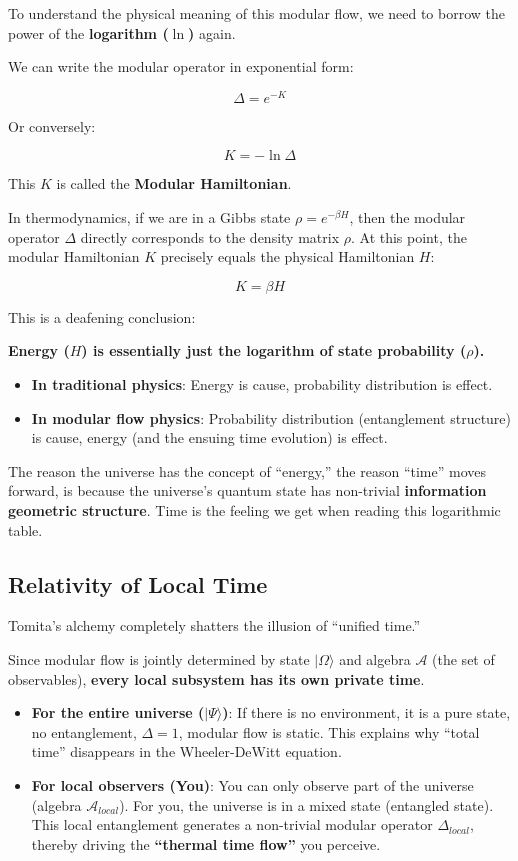 \documentclass[11pt,a4paper,twoside]{book}
\begin{document}
To understand the physical meaning of this modular flow, we need to borrow the power of the \textbf{logarithm ($\ln$)} again.

We can write the modular operator in exponential form:

$$\Delta = e^{-K}$$

Or conversely:

$$K = -\ln \Delta$$

This $K$ is called the \textbf{Modular Hamiltonian}.

In thermodynamics, if we are in a Gibbs state $\rho = e^{-\beta H}$, then the modular operator $\Delta$ directly corresponds to the density matrix $\rho$. At this point, the modular Hamiltonian $K$ precisely equals the physical Hamiltonian $H$:

$$K = \beta H$$

This is a deafening conclusion:

\textbf{Energy ($H$) is essentially just the logarithm of state probability ($\rho$).}

\begin{itemize}
\item \textbf{In traditional physics}: Energy is cause, probability distribution is effect.

\item \textbf{In modular flow physics}: Probability distribution (entanglement structure) is cause, energy (and the ensuing time evolution) is effect.
\end{itemize}

The reason the universe has the concept of ``energy,'' the reason ``time'' moves forward, is because the universe's quantum state has non-trivial \textbf{information geometric structure}. Time is the feeling we get when reading this logarithmic table.

\subsection{Relativity of Local Time}

Tomita's alchemy completely shatters the illusion of ``unified time.''

Since modular flow is jointly determined by state $|\Omega\rangle$ and algebra $\mathcal{A}$ (the set of observables), \textbf{every local subsystem has its own private time}.

\begin{itemize}
\item \textbf{For the entire universe ($|\Psi\rangle$)}: If there is no environment, it is a pure state, no entanglement, $\Delta = 1$, modular flow is static. This explains why ``total time'' disappears in the Wheeler-DeWitt equation.

\item \textbf{For local observers (You)}: You can only observe part of the universe (algebra $\mathcal{A}_{local}$). For you, the universe is in a mixed state (entangled state). This local entanglement generates a non-trivial modular operator $\Delta_{local}$, thereby driving the \textbf{``thermal time flow''} you perceive.
\end{itemize}
\end{document}
